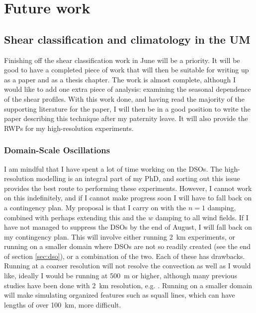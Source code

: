 \documentclass[11pt,a4paper]{article}
\begin{document}
\section{Future work}
\label{sec:Future work}

\subsection{Shear classification and climatology in the UM}
\label{sec:Shear climatology in the UM}

Finishing off the shear classification work in June will be a priority. It will be good to have a completed piece of work that will then be suitable for writing up as a paper and as a thesis chapter. The work is almost complete, although I would like to add one extra piece of analysis: examining the seasonal dependence of the shear profiles. With this work done, and having read the majority of the supporting literature for the paper, I will then be in a good position to write the paper describing this technique after my paternity leave. It will also provide the RWPs for my high-resolution experiments.

\subsubsection{Domain-Scale Oscillations}
\label{sec:dso_future}
I am mindful that I have spent a lot of time working on the DSOs. The high-resolution modelling is an integral part of my PhD, and sorting out this issue provides the best route to performing these experiments. However, I cannot work on this indefinitely, and if I cannot make progress soon I will have to fall back on a contingency plan. My proposal is that I carry on with the $n = 1$ damping, combined with perhaps extending this and the $w$ damping to all wind fields. If I have not managed to suppress the DSOs by the end of August, I will fall back on my contingency plan. This will involve either running \SI{2}{km} experiments, or running on a smaller domain where DSOs are not so readily created (see the end of section \ref{sec:dso}), or a combination of the two. Each of these has drawbacks. Running at a coarser resolution will not resolve the convection as well as I would like, ideally I would be running at \SI{500}{m} or higher, although many previous studies have been done with \SI{2}{km} resolution, e.g. \cite{tompkins2017organization}. Running on a smaller domain will make simulating organized features such as squall lines, which can have lengths of over \SI{100}{km}, more difficult.
\end{document}
